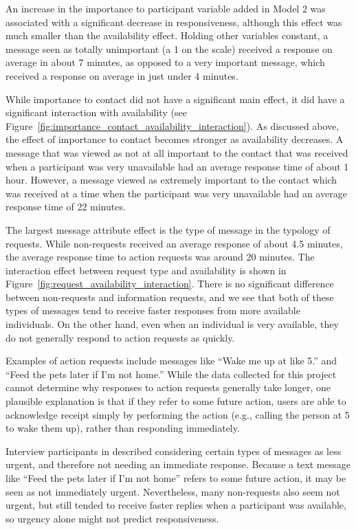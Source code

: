 \documentclass[12pt]{nuthesis}	%
\begin{document}
An increase in the importance to participant variable added in Model 2 was associated with a significant decrease in responsiveness, although this effect was much smaller than the availability effect. Holding other variables constant, a message seen as totally unimportant (a 1 on the scale) received a response on average in about 7 minutes, as opposed to a very important message, which received a response on average in just under 4 minutes.

While importance to contact did not have a significant main effect, it did have a significant interaction with availability (see Figure~\ref{fig:importance_contact_availability_interaction}). As discussed above, the effect of importance to contact becomes stronger as availability decreases. A message that was viewed as not at all important to the contact that was received when a participant was very unavailable had an average response time of about 1 hour. However, a message viewed as extremely important to the contact which was received at a time when the participant was very unavailable had an average response time of 22 minutes.

The largest message attribute effect is the type of message in the typology of requests. While non-requests received an average response of about 4.5 minutes, the average response time to action requests was around 20 minutes.  The interaction effect between request type and availability is shown in Figure~\ref{fig:request_availability_interaction}. There is no significant difference between non-requests and information requests, and we see that both of these types of messages tend to receive faster responses from more available individuals. On the other hand, even when an individual is very available, they do not generally respond to action requests as quickly.

Examples of action requests include messages like ``Wake me up at like 5.'' and ``Feed the pets later if I'm not home.'' While the data collected for this project cannot determine why responses to action requests generally take longer, one plausible explanation is that if they refer to some future action, users are able to acknowledge receipt simply by performing the action (e.g., calling the person at 5 to wake them up), rather than responding immediately.

Interview participants in \citet{wohn2015ambient} described considering certain types of messages as less urgent, and therefore not needing an immediate response. Because a text message like ``Feed the pets later if I'm not home'' refers to some future action, it may be seen as not immediately urgent. Nevertheless, many non-requests also seem not urgent, but still tended to receive faster replies when a participant was available, so urgency alone might not predict responsiveness.
\end{document}
